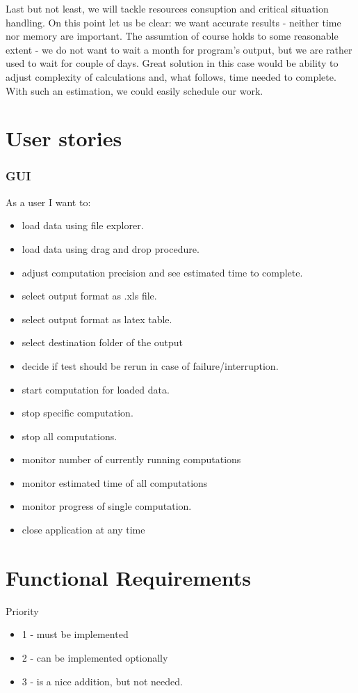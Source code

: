 \documentclass{article}
\begin{document}
Last but not least, we will tackle resources consuption and critical situation handling. On this point let us be clear: we want accurate results - neither time nor memory are important. The assumtion of course holds to some reasonable extent - we do not want to wait a month for program's output, but we are rather used to wait for couple of days. Great solution in this case would be ability to adjust complexity of calculations and, what follows, time needed to complete. With such an estimation, we could easily schedule our work.

\newpage
\section{User stories}

%
%
\subsubsection{GUI}
As a user I want to:
\begin{itemize}
	\item
		load data using file explorer.
	\item
		load data using drag and drop procedure.
	\item
		adjust computation precision and see estimated time to complete.
	\item
		select output format as .xls file.
	\item
		select output format as latex table.
	\item
		select destination folder of the output
	\item
		decide if test should be rerun in case of failure/interruption.
	\item 
		start computation for loaded data.
	\item
		stop specific computation.
	\item
		stop all computations.
	\item 
		monitor number of currently running computations
	\item
		monitor estimated time of all computations
	\item
		monitor progress of single computation.
	\item
		close application at any time
\end{itemize}


	

\newpage

\section{Functional Requirements}
Priority
\begin{itemize} 
\item 1 - must be implemented
\item 2 - can be implemented optionally 
\item 3 - is a nice addition, but not needed.
\end{itemize} 
\end{document}
